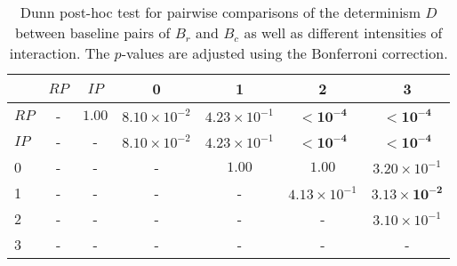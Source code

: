 \begin{table}
\centering
\caption{Dunn post-hoc test for pairwise comparisons of the determinism $D$ between baseline pairs of $B_r$ and $B_c$ as well as different intensities of interaction. The $p$-values are adjusted using the Bonferroni correction.}
\label{tab:dunn_determinism}
\begin{tabular}{lcccccc}
\toprule
 & $RP$ & $IP$ & 0 & 1 & 2 & 3 \\
\midrule
$RP$ & - & $1.00$ & $8.10 \times 10^{-2}$ & $4.23 \times 10^{-1}$ & $\mathbf{< 10^{-4}}$ & $\mathbf{< 10^{-4}}$ \\
$IP$ & - & - & $8.10 \times 10^{-2}$ & $4.23 \times 10^{-1}$ & $\mathbf{< 10^{-4}}$ & $\mathbf{< 10^{-4}}$ \\
0 & - & - & - & $1.00$ & $1.00$ & $3.20 \times 10^{-1}$ \\
1 & - & - & - & - & $4.13 \times 10^{-1}$ & $\mathbf{3.13 \times 10^{-2}}$ \\
2 & - & - & - & - & - & $3.10 \times 10^{-1}$ \\
3 & - & - & - & - & - & - \\
\bottomrule
\end{tabular}
\end{table}
